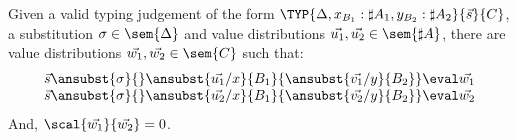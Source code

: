 \begin{lemma}\label{lem:OrthogonalSubstitution} %
Given a valid typing judgement of the form $\TYP{\Delta, x_{B_1}:\sharp A_1, y_{B_2}: \sharp A_2}{\vec{s}}{C}$, a substitution $\sigma\in\sem{\Delta}$ and value distributions $\vec{u_1},\vec{u_2}\in\sem{\sharp A}$, there are value distributions $\vec{w_1},\vec{w_2}\in\sem{C}$ such that:
\[
\begin{array}{c}
    \vec{s}\ansubst{\sigma}{}\ansubst{\vec{u_1}/x}{B_1}{\ansubst{\vec{v_1}/y}{B_2}}\eval\vec{w_1}\\
    \vec{s}\ansubst{\sigma}{}\ansubst{\vec{u_2}/x}{B_1}{\ansubst{\vec{v_2}/y}{B_2}}\eval\vec{w_2}\\
\end{array}
\]
And, $\scal{\vec{w_1}}{\vec{w_2}} = 0$.
\end{lemma}

